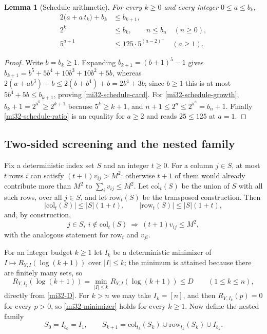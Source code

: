 \documentclass[11pt]{article}
\newtheorem{lemma}[theorem]{Lemma}
\theoremstyle{definition}
\theoremstyle{remark}
\begin{document}
\begin{lemma}[Schedule arithmetic]
\label{mi32-schedule-lemma}
For every $k\ge0$ and every integer $0\le a\le b_k$,
\begin{align}
 2\bigl(a+a\,t_k\bigr)+b_k&\le b_{k+1},
                     \label{mi32-schedule-card}\\
 2^k&\le b_k,\qquad n\le b_n\quad(n\ge0),
                     \label{mi32-schedule-growth}\\
 5^{a+1}&\le125\cdot5^{(a-2)^+}\quad(a\ge1).
                     \label{mi32-schedule-ratio}
\end{align}
\end{lemma}
\begin{proof}
Write $b=b_k\ge1$. Expanding $b_{k+1}=(b+1)^5-1$ gives
$b_{k+1}=b^5+5b^4+10b^3+10b^2+5b$, whereas
$2(a+ab^3)+b\le2(b+b^4)+b=2b^4+3b$; since $b\ge1$ this is at most
$5b^4+5b\le b_{k+1}$, proving \eqref{mi32-schedule-card}. For
\eqref{mi32-schedule-growth}, $b_k+1=2^{5^k}\ge2^{k+1}$ because
$5^k\ge k+1$, and $n+1\le2^n\le2^{5^n}=b_n+1$. Finally
\eqref{mi32-schedule-ratio} is an equality for $a\ge2$ and reads
$25\le125$ at $a=1$.
\end{proof}

\subsection{Two-sided screening and the nested family}
\label{mi32-nested}

Fix a deterministic index set $S$ and an integer $t\ge0$. For a column
$j\in S$, at most $t$ rows $i$ can satisfy $(t+1)v_{ij}>M^2$: otherwise
$t+1$ of them would already contribute more than $M^2$ to
$\sum_iv_{ij}\le M^2$. Let $\mathrm{col}_t(S)$ be the union of $S$ with
all such rows, over all $j\in S$, and let $\mathrm{row}_t(S)$ be the
transposed construction. Then
\begin{equation}\label{mi32-selection-card}
 |\mathrm{col}_t(S)|\le|S|(1+t),\qquad
 |\mathrm{row}_t(S)|\le|S|(1+t),
\end{equation}
and, by construction,
\begin{equation}\label{mi32-selection-screen}
 j\in S,\ i\notin\mathrm{col}_t(S)\ \Longrightarrow\
 (t+1)v_{ij}\le M^2,
\end{equation}
with the analogous statement for $\mathrm{row}_t$ and $v_{ji}$.

For an integer budget $k\ge1$ let $I_k$ be a deterministic minimizer of
$I\mapsto R_{Y,I}(\log(k+1))$ over $|I|\le k$; the minimum is attained
because there are finitely many sets, so
\begin{equation}\label{mi32-minimizer}
 R_{Y,I_k}(\log(k+1))=\min_{|I|\le k}R_{Y,I}(\log(k+1))\le D
 \qquad(1\le k\le n),
\end{equation}
directly from \eqref{mi32-D}. For $k>n$ we may take $I_k=[n]$, and then
$R_{Y,I_k}(p)=0$ for every $p>0$, so \eqref{mi32-minimizer} holds for
every $k\ge1$. Now define the nested family
\begin{equation}\label{mi32-nested-def}
 S_0=I_{b_0}=I_1,\qquad
 S_{k+1}=\mathrm{col}_{t_k}(S_k)\cup\mathrm{row}_{t_k}(S_k)
                \cup I_{b_k}.
\end{equation}
\end{document}
